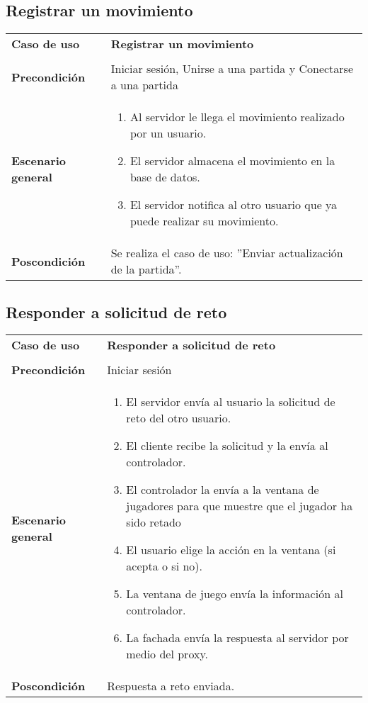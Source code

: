 \subsection{Registrar un movimiento}

{\footnotesize
\begin{tabularx}{0.95\textwidth}{p{}|X}

\textbf{Caso de uso} & \textbf{Registrar un movimiento} \\
& \\
\textbf{Precondición} & Iniciar sesión, Unirse a una partida y Conectarse a una
partida \\

\textbf{Escenario general} & \begin{enumerate}
\item Al servidor le llega el movimiento realizado por un usuario.
\item El servidor almacena el movimiento en la base de datos.
\item El servidor notifica al otro usuario que ya puede realizar su movimiento.
\end{enumerate} \\

\textbf{Poscondición} & Se realiza el caso de uso: ''Enviar actualización de la
partida''.\\

\end{tabularx}
}

\subsection{Responder a solicitud de reto}
{\footnotesize
\begin{tabularx}{0.95\textwidth}{p{}|X}

\textbf{Caso de uso} & \textbf{Responder a solicitud de reto} \\
& \\
\textbf{Precondición} & Iniciar sesión\\

\textbf{Escenario general} & \begin{enumerate}
\item El servidor envía al usuario la solicitud de reto del otro usuario.
\item El cliente recibe la solicitud y la envía al controlador.
\item El controlador la envía a la ventana de jugadores para que muestre que el jugador ha sido retado
\item El usuario elige la acción en la ventana (si acepta o si no).
\item La ventana de juego envía la información al controlador.
\item La fachada envía la respuesta al servidor por medio del proxy.
\end{enumerate} \\

\textbf{Poscondición} & Respuesta a reto enviada.

\end{tabularx}
}

